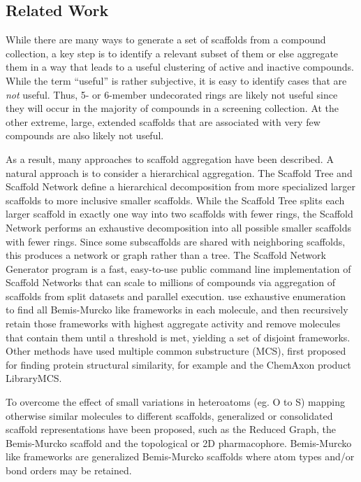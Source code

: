 \documentclass[journal=jacsat,manuscript=article]{achemso}
\begin{document}
\subsection{Related Work}
While there are many ways to generate a set of scaffolds from a
compound collection, a key step is to identify a
relevant subset of them or else aggregate them in a way that leads to a useful
clustering of active and inactive compounds. While the term ``useful'' is rather
subjective, it is easy to identify cases that are \emph{not} useful. Thus, 5- or
6-member undecorated rings are likely not useful since they will occur in the
majority of compounds in a screening collection. At the other extreme, large,
extended scaffolds that are associated with very few compounds are also likely
not useful.

As a result, many approaches to scaffold aggregation have been described. A
natural approach is to consider a hierarchical aggregation. The Scaffold
Tree\cite{Ertl2011ScaffoldTree} and Scaffold Network\cite{Varin2011ScafNet}
define a hierarchical decomposition from more specialized larger scaffolds to
more inclusive smaller scaffolds. While the Scaffold Tree splits each larger
scaffold in exactly one way into two scaffolds with fewer rings, the Scaffold
Network performs an exhaustive decomposition into all possible smaller scaffolds
with fewer rings.  Since some subscaffolds are shared with neighboring
scaffolds, this produces a network or graph rather than a tree. The Scaffold
Network Generator program\cite{Matlock2013SNG} is a fast, easy-to-use public
command line implementation of Scaffold Networks that can scale to millions of
compounds via aggregation of scaffolds from split datasets and parallel
execution.  \citeauthor{Harper2004DDclus} use exhaustive enumeration to find all
Bemis-Murcko like frameworks in each molecule, and then recursively retain those
frameworks with highest aggregate activity and remove molecules that contain
them until a threshold is met, yielding a set of disjoint frameworks.  Other
methods have used multiple common substructure (MCS), first proposed for finding
protein structural similarity\cite{Koch1997MCSprot}, for example
\citeauthor{Quintus2009MCS} and the ChemAxon product LibraryMCS. 

To overcome the effect of small variations in heteroatoms (eg. O to S) mapping
otherwise similar molecules to different scaffolds, generalized or consolidated
scaffold representations have been proposed, such as the Reduced
Graph\cite{Barker2003RG}, the Bemis-Murcko scaffold\cite{BemisMurcko1996} and
the topological or 2D pharmacophore\cite{Schneider1999ScafHopTP}. Bemis-Murcko
like frameworks \cite{Harper2004DDclus} are generalized Bemis-Murcko scaffolds
where atom types and/or bond orders may be retained.
\end{document}
